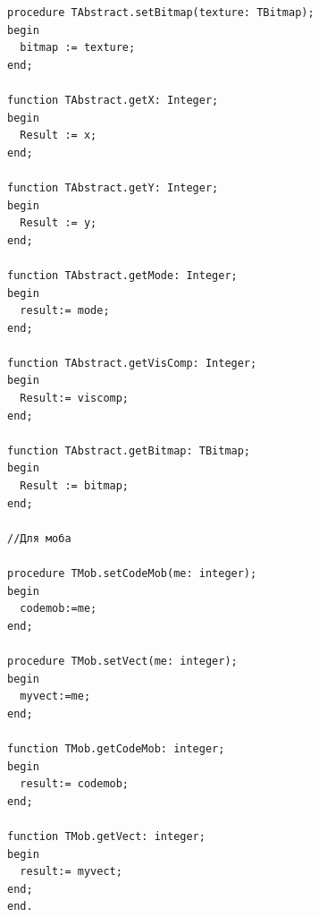 \documentclass[a4paper,14pt]{extarticle}
\begin{document}
\begin{verbatim}
procedure TAbstract.setBitmap(texture: TBitmap);
begin
  bitmap := texture;
end;

function TAbstract.getX: Integer;
begin
  Result := x;
end;

function TAbstract.getY: Integer;
begin
  Result := y;
end;

function TAbstract.getMode: Integer;
begin
  result:= mode;
end;

function TAbstract.getVisComp: Integer;
begin
  Result:= viscomp;
end;

function TAbstract.getBitmap: TBitmap;
begin
  Result := bitmap;
end;

//Для моба

procedure TMob.setCodeMob(me: integer);
begin
  codemob:=me;
end;

procedure TMob.setVect(me: integer);
begin
  myvect:=me;
end;

function TMob.getCodeMob: integer;
begin
  result:= codemob;
end;

function TMob.getVect: integer;
begin
  result:= myvect;
end;
end.
\end{verbatim}
\end{document}

